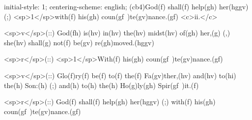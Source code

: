 initial-style: 1;
centering-scheme: english;
(cb4)God(f) shall(f) help(gh) her(hggv) (;) <sp>1</sp>with(f) his(gh) coun(gf~)te(gv)nance.(gf) <c>ii.</c>

<sp>v</sp>(::) God(fh) is(hv) in(hv) the(hv) midst(hv) of(gh) her,(g) (,) she(hv) shall(g) not(f) be(gv) re(gh)moved.(hggv)

<sp>r</sp>(::) <sp>1</sp>With(f) his(gh) coun(gf~)te(gv)nance.(gf)

<sp>v</sp>(::) Glo(f)ry(f) be(f) to(f) the(f) Fa(gv)ther,(hv) and(hv) to(hi) the(h) Son:(h) (;) and(h) to(h) the(h) Ho(g)ly(gh) Spir(gf~)it.(f)

<sp>r</sp>(::) God(f) shall(f) help(gh) her(hggv) (;) with(f) his(gh) coun(gf~)te(gv)nance.(gf)
